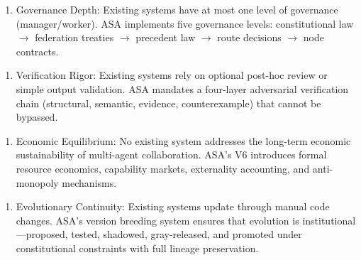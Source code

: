 \documentclass[12pt,a4paper]{article}
\begin{document}
\begin{enumerate}
  \item Governance Depth: Existing systems have at most one level of governance (manager/worker). ASA implements five governance levels: constitutional law $\rightarrow$ federation treaties $\rightarrow$ precedent law $\rightarrow$ route decisions $\rightarrow$ node contracts.
\end{enumerate}

\begin{enumerate}
  \item Verification Rigor: Existing systems rely on optional post-hoc review or simple output validation. ASA mandates a four-layer adversarial verification chain (structural, semantic, evidence, counterexample) that cannot be bypassed.
\end{enumerate}

\begin{enumerate}
  \item Economic Equilibrium: No existing system addresses the long-term economic sustainability of multi-agent collaboration. ASA's V6 introduces formal resource economics, capability markets, externality accounting, and anti-monopoly mechanisms.
\end{enumerate}

\begin{enumerate}
  \item Evolutionary Continuity: Existing systems update through manual code changes. ASA's version breeding system ensures that evolution is institutional---proposed, tested, shadowed, gray-released, and promoted under constitutional constraints with full lineage preservation.
\end{enumerate}
\end{document}
